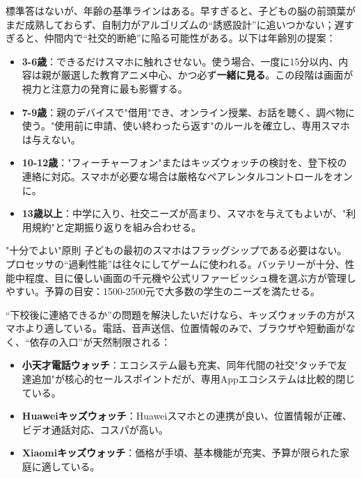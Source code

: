 


標準答はないが、年齢の基準ラインはある。早すぎると、子どもの脳の前頭葉がまだ成熟しておらず、自制力がアルゴリズムの“誘惑設計”に追いつかない；遅すぎると、仲間内で“社交的断絶”に陥る可能性がある。以下は年齢別の提案：

\begin{itemize}
  \item \textbf{3-6歳}：できるだけスマホに触れさせない。使う場合、一度に15分以内、内容は親が厳選した教育アニメ中心、かつ必ず\textbf{一緒に見る}。この段階は画面が視力と注意力の発育に最も影響する。
  \item \textbf{7-9歳}：親のデバイスで"借用"でき、オンライン授業、お話を聴く、調べ物に使う。"使用前に申請、使い終わったら返す"のルールを確立し、専用スマホは与えない。
  \item \textbf{10-12歳}："フィーチャーフォン"またはキッズウォッチの検討を、登下校の連絡に対応。スマホが必要な場合は厳格なペアレンタルコントロールをオンに。
  \item \textbf{13歳以上}：中学に入り、社交ニーズが高まり、スマホを与えてもよいが、"利用規約"と定期振り返りを組み合わせる。
\end{itemize}

\begin{tcbinfo}{"十分でよい"原則}
子どもの最初のスマホはフラッグシップである必要はない。プロセッサの“過剰性能”は往々にしてゲームに使われる。バッテリーが十分、性能中程度、目に優しい画面の千元機や公式リファービッシュ機を選ぶ方が管理しやすい。予算の目安：1500-2500元で大多数の学生のニーズを満たせる。

\end{tcbinfo}


“下校後に連絡できるか”の問題を解決したいだけなら、キッズウォッチの方がスマホより適している。電話、音声送信、位置情報のみで、ブラウザや短動画がなく、“依存の入口”が天然制限される：

\begin{itemize}
  \item \textbf{小天才電話ウォッチ}：エコシステム最も充実、同年代間の社交"タッチで友達追加"が核心的セールスポイントだが、専用Appエコシステムは比較的閉じている。
  \item \textbf{Huaweiキッズウォッチ}：Huaweiスマホとの連携が良い、位置情報が正確、ビデオ通話対応、コスパが高い。
  \item \textbf{Xiaomiキッズウォッチ}：価格が手頃、基本機能が充実、予算が限られた家庭に適している。
\end{itemize}

